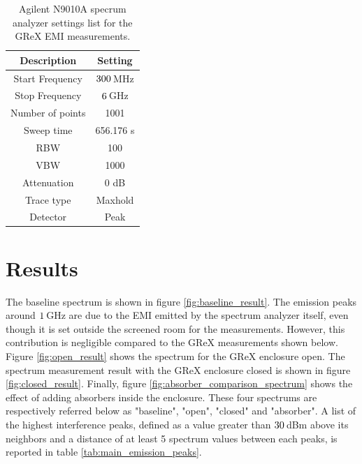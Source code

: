 \documentclass[12pt,a4paper,oneside]{article}
\begin{document}
\begin{table}[]
    \centering
   
    \begin{tabular}{|c|c|}
    \hline
         \cellcolor[gray]{0.85} Description & \cellcolor[gray]{0.85} Setting \\ \hline
          Start Frequency & $300\thinspace$MHz \\ \hline
          Stop Frequency & $6\thinspace$GHz \\ \hline
          Number of points & 1001 \\ \hline
          Sweep time & 656.176 s\\ \hline
          RBW & 100 \\ \hline
          VBW & 1000 \\ \hline
          Attenuation & 0 dB\\ \hline
          Trace type & Maxhold \\ \hline
          Detector & Peak \\ \hline         
    \end{tabular}
    \caption{ Agilent N9010A specrum analyzer settings list for the GReX EMI measurements.}
    \label{tab:spectrum_analyzer_settings}
\end{table}
\section{Results}
\label{sec:Results}

The baseline spectrum is shown in figure \ref{fig:baseline_result}. The emission peaks around $1\thinspace$GHz are due to the EMI emitted by the spectrum analyzer itself, even though it is set outside the screened room for the measurements. However, this contribution is negligible compared to the GReX measurements shown below. Figure \ref{fig:open_result} shows the spectrum for the GReX enclosure open. The spectrum measurement result with the GReX enclosure closed is shown in figure \ref{fig:closed_result}. Finally, figure \ref{fig:absorber_comparison_spectrum} shows the effect of adding absorbers inside the enclosure. These four spectrums are respectively referred below as "baseline", "open", "closed" and "absorber". A list of the highest interference peaks, defined as a value greater than $30\thinspace$dBm above its neighbors and a distance of at least 5 spectrum values between each peaks, is reported in table \ref{tab:main_emission_peaks}.
\end{document}
